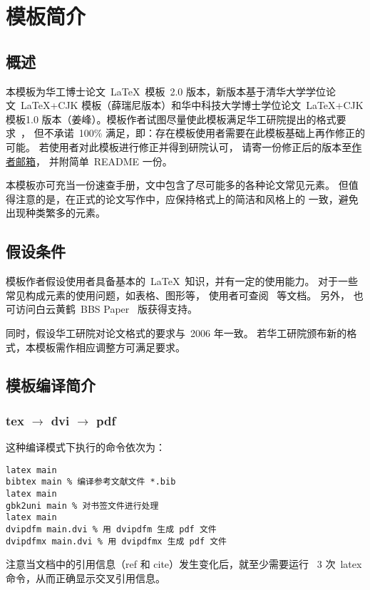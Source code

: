 
\chapter{模板简介}
\thispagestyle{plain}
\renewcommand{\currentchapter}{\thechapter \textbf{模板简介}}
\label{cha:intro}

\section{概述}
\label{sec:general intro}

本模板为华工博士论文~\LaTeX~模板~2.0
版本，新版本基于清华大学学位论文~\LaTeX+CJK
模板（薛瑞尼版本）和华中科技大学博士学位论文~\LaTeX+CJK 模板1.0
版本（姜峰）。模板作者试图尽量使此模板满足华工研院提出的格式要求~\cite{meng}，
但不承诺~100\%
满足，即：存在模板使用者需要在此模板基础上再作修正的可能。
若使用者对此模板进行修正并得到研院认可，
请寄一份修正后的版本至\href{hust_liuhuikan@yeah.net}{作者邮箱}，
并附简单~README 一份。

本模板亦可充当一份速查手册，文中包含了尽可能多的各种论文常见元素。
但值得注意的是，在正式的论文写作中，应保持格式上的简洁和风格上的
一致，避免出现种类繁多的元素。

\section{假设条件}
\label{sec:assumption}

模板作者假设使用者具备基本的~\LaTeX~知识，并有一定的使用能力。
对于一些常见构成元素的使用问题，如表格、图形等，
使用者可查阅~ 等文档。 另外，
也可访问白云黄鹤~BBS Paper~ 版获得支持。

同时，假设华工研院对论文格式的要求与~2006 年一致。
若华工研院颁布新的格式，本模板需作相应调整方可满足要求。

\section{模板编译简介}
\label{sec:compile}

\subsection{tex $\rightarrow$ dvi $\rightarrow$ pdf}
\label{sec:dvipdf}

这种编译模式下执行的命令依次为：
\begin{verbatim}
latex main
bibtex main % 编译参考文献文件 *.bib
latex main
gbk2uni main % 对书签文件进行处理
latex main
dvipdfm main.dvi % 用 dvipdfm 生成 pdf 文件
dvipdfmx main.dvi % 用 dvipdfmx 生成 pdf 文件
\end{verbatim}
注意当文档中的引用信息（ref 和 cite）发生变化后，就至少需要运行~
3 次~latex 命令，从而正确显示交叉引用信息。


